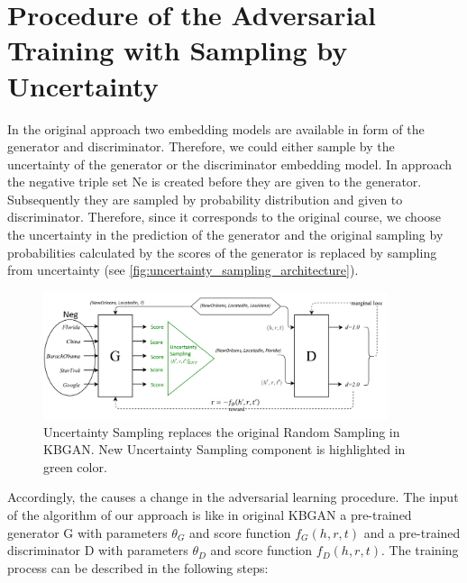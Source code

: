 \section{Procedure of the Adversarial Training with Sampling by Uncertainty}
\label{sec:procedure}
In the original \kbgan approach two embedding models are available in form of the generator and discriminator.
Therefore, we could either sample by the uncertainty of the generator or the discriminator embedding model.
In \kbgan approach the negative triple set Ne is created before they are given to the generator.
Subsequently they are sampled by probability distribution and given to discriminator.
Therefore, since it corresponds to the original course, we choose the uncertainty in the prediction of the generator and the original sampling by probabilities calculated by the scores of the generator is replaced by sampling from uncertainty (see \autoref{fig:uncertainty_sampling_architecture}).
\begin{figure}[t]
  \centering
    \includegraphics[width=0.90\textwidth]{figures/architecture.png}
  \caption{Uncertainty Sampling replaces the original Random Sampling in \ac{KBGAN}. 
  New Uncertainty Sampling component is highlighted in green color.}
  \label{fig:uncertainty_sampling_architecture}
\end{figure}
Accordingly, the causes a change in the adversarial learning procedure.
The input of the algorithm of our approach is like in original \ac{KBGAN} a pre-trained generator G with parameters $\theta_G$ and score function $f_G(h,r,t)$ and a pre-trained discriminator D with parameters $\theta_D$ and score function $f_D(h,r,t)$.
The training process can be described in the following steps:
